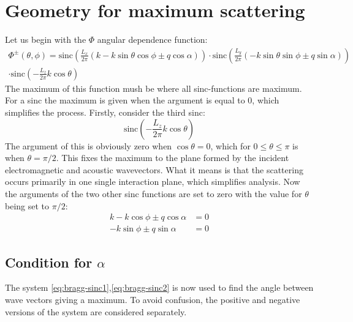 \documentclass[10pt,a4paper]{eitExjobb}
\begin{document}
	\section{Geometry for maximum scattering \label{app:braggmax}}
	Let us begin with the $\Phi$ angular dependence function:
	\begin{multline*}
	\Phi^\pm(\theta,\phi) = \text{sinc} \left( \frac{L_x}{2\pi} \left( k - k\sin{\theta}\cos{\phi} \pm q\cos{\alpha} \right) \right) 
	\cdot \text{sinc} \left( \frac{L_y}{2\pi} \left( -k\sin{\theta}\sin{\phi} \pm q\sin{\alpha} \right) \right) \\
	\cdot \text{sinc} \left( -\frac{L_z}{2\pi} k\cos{\theta} \right)
	\end{multline*}
	The maximum of this function mush be where all sinc-functions are maximum. For a sinc the maximum is given when the argument is equal to 0, which simplifies the process. Firstly, consider the third sinc:
	\begin{equation*}
	\text{sinc} \left( -\frac{L_z}{2\pi} k\cos{\theta} \right)
	\end{equation*}
	The argument of this is obviously zero when $\cos{\theta} = 0$, which for $0 \leq \theta \leq \pi$ is when $\theta = \pi/2$. This fixes the maximum to the plane formed by the incident electromagnetic and acoustic wavevectors. What it means is that the scattering occurs primarily in one single interaction plane, which simplifies analysis. Now the arguments of the two other sinc functions are set to zero with the value for $\theta$ being set to $\pi/2$:
	\begin{align}
	k - k\cos{\phi} \pm q\cos{\alpha} &= 0 \label{eq:bragg-sinc1} \\
	-k\sin{\phi} \pm q\sin{\alpha} &= 0 \label{eq:bragg-sinc2}
	\end{align}
	
	\subsection{Condition for $\alpha$}
	The system \ref{eq:bragg-sinc1},\ref{eq:bragg-sinc2} is now used to find the angle between wave vectors giving a maximum. To avoid confusion, the positive and negative versions of the system are considered separately.
	
\end{document}
